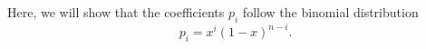 Here, we will show that the coefficients $p_i$ follow the binomial distribution
\begin{equation}
p_i = x^i(1-x)^{n-i}.
\end{equation}



